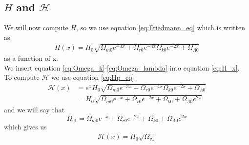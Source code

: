 \documentclass{article}
\begin{document}
\begin{multicols}{2}
\subsection{$H$ and $\mathcal{H}$}
We will now compute $H$, so we use equation \eqref{eq:Friedmann_eq} which is written as 
\begin{align}
     H(x)=H_0\sqrt{\Omega_{m0}e^{-3x}+\Omega_{r0}e^{-4x}\Omega_{k0}e^{-2x}+\Omega_{\Lambda0}} \label{eq:H_x}
\end{align}
as a function of x.\\
We insert equation \eqref{eq:Omega_k}-\eqref{eq:Omega_lambda} into equation \eqref{eq:H_x}.\\
To compute $\mathcal{H}$ we use equation \eqref{eq:Hp_eq}  
\begin{align}
    \mathcal{H}(x)&=e^xH_0\sqrt{{\Omega_{m0}e^{-3x}+\Omega_{r0}e^{-4x}\Omega_{k0}e^{-2x}+\Omega_{\Lambda0}}}\\
    &=H_0\sqrt{\Omega_{m0}e^{-x}+\Omega_{r0}e^{-2x}+\Omega_{k0}+\Omega_{\Lambda0}e^{2x}}\label{eq:Hp_eq}
\end{align}
and we will say that $$\Omega_{v1}=\Omega_{m0}e^{-x}+\Omega_{r0}e^{-2x}+\Omega_{k0}+\Omega_{\Lambda0}e^{2x}$$ which gives us \begin{align}
     \mathcal{H}(x)=H_0\sqrt{\Omega_{v1}} \label{eq:Hp_x_omega}
\end{align}  

\end{multicols}
\end{document}
